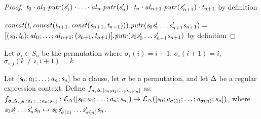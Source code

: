\begin{lemma}
\begin{proof}
$\mathit{t}_0\cdot\mathit{al}_1.\mathit{putr}(\mathit{s}_1')\cdot\ldots\cdot\mathit{al}_n.\mathit{putr}(\mathit{s}_n')\cdot\mathit{t}_n\cdot\mathit{al}_{n+1}.\mathit{putr}(\mathit{s}_{n+1}')\cdot\mathit{t}_{n+1}$ by definition\\
\\
$\mathit{concat}(\mathit{l},\mathit{concat}(\mathit{l}_{n+1},\mathit{const}(\mathit{s}_{n+1},\mathit{t}_{n+1}))).\mathit{putr}
(\mathit{s}_0\mathit{s}_1'\ldots\mathit{s}_{n+1}'\mathit{s}_{n+1}) =$\\
$[(\mathit{s}_0,\mathit{t}_0);\mathit{al}_0;\ldots;\mathit{al}_{n+1};(\mathit{s}_{n+1},\mathit{t}_{n+1})].\mathit{putr}(\mathit{s}_0\mathit{s}_0'\ldots\mathit{s}_{n+1}'\mathit{s}_{n+1})$ by definition
\end{proof}
\end{lemma}

\begin{definition}
Let $\sigma_{i} \in S_n$ be the permutation where
$\sigma_{i}(i) = i+1$, $\sigma_{i}(i+1) = i$, $\sigma_{i,j}(k\neq i,i+1) = k$
\end{definition}

\begin{definition}
Let $[\mathit{s}_0;\mathit{a}_1;\ldots;\mathit{a}_n;\mathit{s}_n]$ be a clause, let $\sigma$ be a permutation, and let $\Delta$ be a regular expression context.
Define
$f_{\sigma,\Delta,[\mathit{s}_0;\mathit{a}_1;\ldots;\mathit{a}_n;\mathit{s}_n]}$ as:
$f_{\sigma,\Delta,[\mathit{s}_0;\mathit{a}_1;\ldots;\mathit{a}_n;\mathit{s}_n]}: \mathcal{L}_{\Delta}([\mathit{s}_0;\mathit{a}_1;\ldots;\mathit{a}_n;\mathit{s}_n])\rightarrow\mathcal{L}_{\Delta}([\mathit{s}_0;\mathit{a}_{\sigma(1)};\ldots;\mathit{a}_{\sigma(n)};\mathit{s}_n])$, where $\mathit{s}_0\mathit{s}_1'\ldots\mathit{s}_n'\mathit{s}_n\mapsto\mathit{s}_0\mathit{s}_{\sigma(1)}'\ldots\mathit{s}_{\sigma(n)}'\mathit{s}_n$.
\end{definition}

